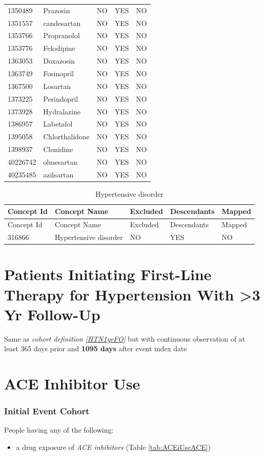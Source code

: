 \documentclass[10.5pt]{book}
\providecommand{\tightlist}{%
  \setlength{\itemsep}{0pt}\setlength{\parskip}{0pt}}
\theoremstyle{definition}
\theoremstyle{definition}
\theoremstyle{definition}
\theoremstyle{remark}
\begin{document}
\begin{longtable}[]{@{}lllll@{}}
1350489 & Prazosin & NO & YES & NO\tabularnewline
1351557 & candesartan & NO & YES & NO\tabularnewline
1353766 & Propranolol & NO & YES & NO\tabularnewline
1353776 & Felodipine & NO & YES & NO\tabularnewline
1363053 & Doxazosin & NO & YES & NO\tabularnewline
1363749 & Fosinopril & NO & YES & NO\tabularnewline
1367500 & Losartan & NO & YES & NO\tabularnewline
1373225 & Perindopril & NO & YES & NO\tabularnewline
1373928 & Hydralazine & NO & YES & NO\tabularnewline
1386957 & Labetalol & NO & YES & NO\tabularnewline
1395058 & Chlorthalidone & NO & YES & NO\tabularnewline
1398937 & Clonidine & NO & YES & NO\tabularnewline
40226742 & olmesartan & NO & YES & NO\tabularnewline
40235485 & azilsartan & NO & YES & NO\tabularnewline
\bottomrule
\end{longtable}

\begin{longtable}[]{@{}lllll@{}}
\caption{\label{tab:HTN1yrFOHypertensiveDisorder} Hypertensive
disorder}\tabularnewline
\toprule
Concept Id & Concept Name & Excluded & Descendants &
Mapped\tabularnewline
\midrule
\endfirsthead
\toprule
Concept Id & Concept Name & Excluded & Descendants &
Mapped\tabularnewline
\midrule
\endhead
316866 & Hypertensive disorder & NO & YES & NO\tabularnewline
\bottomrule
\end{longtable}

\section{Patients Initiating First-Line Therapy for Hypertension With
\textgreater{}3 Yr Follow-Up}\label{HTN3yrFO}

Same as \emph{cohort definition \ref{HTN1yrFO}} but with continuous
observation of at least 365 days prior and \textbf{1095 days} after
event index date

\section{ACE Inhibitor Use}\label{ACEiUse}

\subsubsection*{Initial Event Cohort}\label{initial-event-cohort-6}

People having any of the following:

\begin{itemize}
\tightlist
\item
  a drug exposure of \emph{ACE inhibitors} (Table \ref{tab:ACEiUseACE})
\end{itemize}
\end{document}
